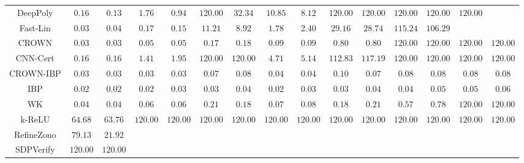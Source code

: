 \begin{table*}
{\begin{tabular}{c|c|c|c|c|c|c|c|c|c|c|c|c|c|c}
     DeepPoly &        $0.16$ &        $0.13$ &        $1.76$ &        $0.94$ &      $120.00$ &       $32.34$ &       $10.85$ &        $8.12$ &      $120.00$ &      $120.00$ &      $120.00$ &      $120.00$ &      $120.00$ &               \\
     Fast-Lin &        $0.03$ &        $0.04$ &        $0.17$ &        $0.15$ &       $11.21$ &        $8.92$ &        $1.78$ &        $2.40$ &       $29.16$ &       $28.74$ &      $115.24$ &      $106.29$ &               &               \\
        CROWN &        $0.03$ &        $0.03$ &        $0.05$ &        $0.05$ &        $0.17$ &        $0.18$ &        $0.09$ &        $0.09$ &        $0.80$ &        $0.80$ &      $120.00$ &      $120.00$ &      $120.00$ &      $120.00$ \\
     CNN-Cert &        $0.16$ &        $0.16$ &        $1.41$ &        $1.95$ &      $120.00$ &      $120.00$ &        $4.71$ &        $5.14$ &      $112.83$ &      $117.19$ &      $120.00$ &      $120.00$ &      $120.00$ &      $120.00$ \\
    CROWN-IBP &        $0.03$ &        $0.03$ &        $0.03$ &        $0.03$ &        $0.07$ &        $0.08$ &        $0.04$ &        $0.04$ &        $0.10$ &        $0.07$ &        $0.08$ &        $0.08$ &        $0.08$ &        $0.08$ \\
          IBP &        $0.02$ &        $0.02$ &        $0.02$ &        $0.03$ &        $0.03$ &        $0.04$ &        $0.02$ &        $0.03$ &        $0.03$ &        $0.04$ &        $0.04$ &        $0.05$ &        $0.05$ &        $0.06$ \\
           WK &        $0.04$ &        $0.04$ &        $0.06$ &        $0.06$ &        $0.21$ &        $0.18$ &        $0.07$ &        $0.08$ &        $0.18$ &        $0.21$ &        $0.57$ &        $0.78$ &      $120.00$ &      $120.00$ \\
       k-ReLU &       $64.68$ &       $63.76$ &      $120.00$ &      $120.00$ &      $120.00$ &      $120.00$ &      $120.00$ &      $120.00$ &      $120.00$ &      $120.00$ &      $120.00$ &      $120.00$ &      $120.00$ &      $120.00$ \\
   RefineZono &       $79.13$ &       $21.92$ &               &               &               &               &               &               &               &               &               &               &               &               \\
    SDPVerify &      $120.00$ &      $120.00$ &               &               &               &               &               &               &               &               &               &               &               &               \\

\end{tabular}}
\end{table*}
